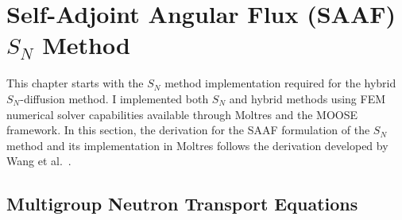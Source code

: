 
\section{Self-Adjoint Angular Flux (SAAF) $S_N$ Method} \label{sec:saaf}

This chapter starts with the $S_N$ method implementation required for the hybrid $S_N$-diffusion
method. I implemented both $S_N$ and hybrid methods using \gls{FEM} numerical solver capabilities
available through Moltres \cite{lindsay_moltres_2017} and the \gls{MOOSE} framework. In this
section, the derivation for the \gls{SAAF} formulation of the $S_N$ method and its
implementation in Moltres follows the derivation developed by Wang et al.\
\cite{wang_diffusion_2014, wang_rattlesnake_2018}.

\subsection{Multigroup Neutron Transport Equations}

